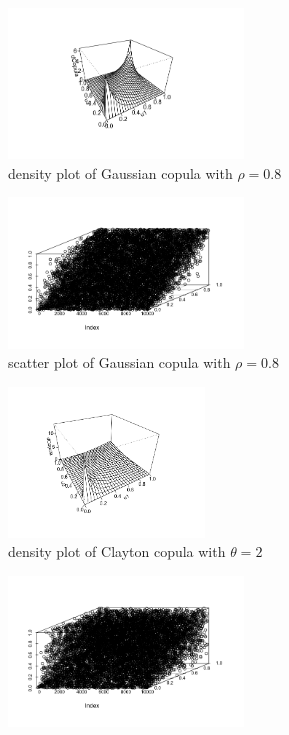 \documentclass[mstat,12pt]{unswthesis}  %
\numberwithin{equation}{section}
\begin{document}
\begin{figure}[h]
\begin{subfigure}{.5\textwidth}
  \centering
  \includegraphics[width=\linewidth,height=4cm]{gaussiand.png}  
  \caption{density plot of Gaussian copula with $\rho=0.8$}
  \label{fig:sub-first}
\end{subfigure}
\begin{subfigure}{.5\textwidth}
  \centering
  \includegraphics[width=\linewidth,height=4cm]{gaussainr.png}  
  \caption{scatter plot of Gaussian copula with $\rho=0.8$}
  \label{fig:sub-second}
\end{subfigure}
\begin{subfigure}{.5\textwidth}
  \centering
  \includegraphics[width=\linewidth,height=4cm]{scattercc.png}  
  \caption{density plot of Clayton copula with $\theta=2$}
  \label{fig:sub-third}
\end{subfigure}
\begin{subfigure}{.5\textwidth}
  \centering
  \includegraphics[width=\linewidth,height=4cm]{claytonr.png}  

\end{subfigure}
\end{figure}
\end{document}
